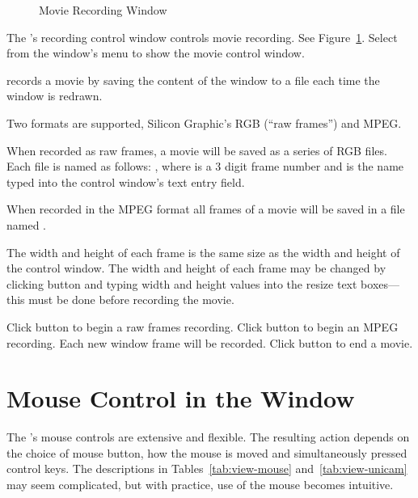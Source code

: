 \begin{figure}[htb]
  \begin{makeimage}
  \end{makeimage}
  \recordmoviewin
  \caption{\label{fig:recordmoviewin} Movie Recording Window}
\end{figure}

The \viewer{}'s recording control window controls movie recording.  See
Figure~\ref{fig:recordmoviewin}.  Select  from
the \viewer{} window's  menu to show the movie control window.

\sr{} records a movie by saving the content of the \viewer{} window to
a file each time the \viewer{} window is redrawn.

Two formats are supported, Silicon Graphic's RGB (``raw frames'') and
MPEG.

When recorded as raw frames, a movie will be saved as a series of RGB
files.  Each file is named as follows:
, where
 is a 3 digit frame number and  is
the name typed into the control window's text entry field.

When recorded in the MPEG format all frames of a movie will be saved
in a file named .

The width and height of each frame is the same size as the width and
height of the \viewer{} control window.  The width and height of each
frame may be changed by clicking button  and typing
width and height values into the resize text boxes---this must be done
before recording the movie.

Click button  to begin a raw frames recording.
Click button  to begin an MPEG recording.  Each new
\viewer{} window frame will be recorded.  Click button  to end a movie.


\section{Mouse Control in the \viewer{} Window}
\label{sec:view-mouse} 

The \viewer{}'s mouse controls are extensive and flexible.  The
resulting action depends on the choice of mouse button, how the mouse
is moved and simultaneously pressed control keys.  The descriptions in
Tables~\ref{tab:view-mouse} and~\ref{tab:view-unicam} may seem
complicated, but with practice, use of the mouse becomes intuitive.


